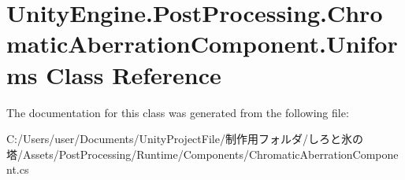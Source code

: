 \hypertarget{class_unity_engine_1_1_post_processing_1_1_chromatic_aberration_component_1_1_uniforms}{}\section{Unity\+Engine.\+Post\+Processing.\+Chromatic\+Aberration\+Component.\+Uniforms Class Reference}
\label{class_unity_engine_1_1_post_processing_1_1_chromatic_aberration_component_1_1_uniforms}


The documentation for this class was generated from the following file\+:\begin{DoxyCompactItemize}
\item 
C\+:/\+Users/user/\+Documents/\+Unity\+Project\+File/制作用フォルダ/しろと氷の塔/\+Assets/\+Post\+Processing/\+Runtime/\+Components/Chromatic\+Aberration\+Component.\+cs\end{DoxyCompactItemize}

